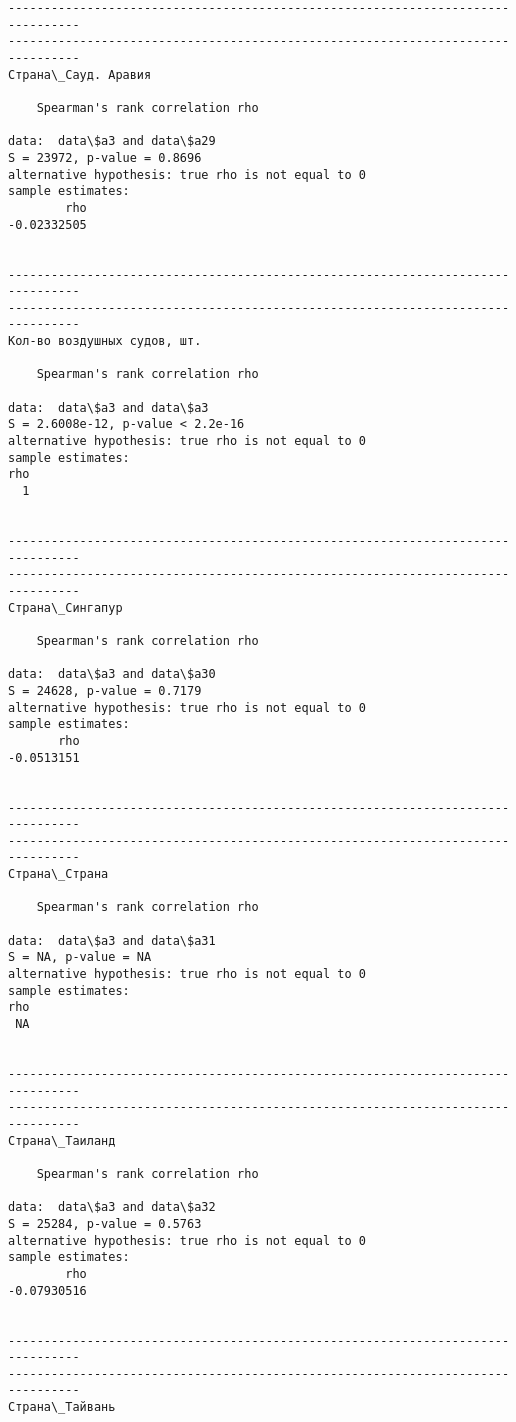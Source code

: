 \documentclass[11pt,mathletters]{article}
\begin{document}
\begin{Verbatim}[commandchars=\\\{\}]
--------------------------------------------------------------------------------
--------------------------------------------------------------------------------
Страна\_Сауд. Аравия

	Spearman's rank correlation rho

data:  data\$a3 and data\$a29
S = 23972, p-value = 0.8696
alternative hypothesis: true rho is not equal to 0
sample estimates:
        rho 
-0.02332505 


--------------------------------------------------------------------------------
--------------------------------------------------------------------------------
Кол-во воздушных судов, шт. 

	Spearman's rank correlation rho

data:  data\$a3 and data\$a3
S = 2.6008e-12, p-value < 2.2e-16
alternative hypothesis: true rho is not equal to 0
sample estimates:
rho 
  1 


--------------------------------------------------------------------------------
--------------------------------------------------------------------------------
Страна\_Сингапур

	Spearman's rank correlation rho

data:  data\$a3 and data\$a30
S = 24628, p-value = 0.7179
alternative hypothesis: true rho is not equal to 0
sample estimates:
       rho 
-0.0513151 


--------------------------------------------------------------------------------
--------------------------------------------------------------------------------
Страна\_Страна

	Spearman's rank correlation rho

data:  data\$a3 and data\$a31
S = NA, p-value = NA
alternative hypothesis: true rho is not equal to 0
sample estimates:
rho 
 NA 


--------------------------------------------------------------------------------
--------------------------------------------------------------------------------
Страна\_Таиланд

	Spearman's rank correlation rho

data:  data\$a3 and data\$a32
S = 25284, p-value = 0.5763
alternative hypothesis: true rho is not equal to 0
sample estimates:
        rho 
-0.07930516 


--------------------------------------------------------------------------------
--------------------------------------------------------------------------------
Страна\_Тайвань


\end{Verbatim}
\end{document}
